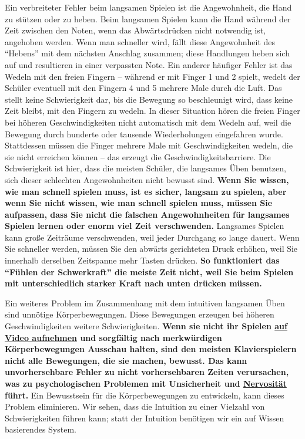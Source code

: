 Ein verbreiteter Fehler beim langsamen Spielen ist die Angewohnheit, die Hand zu stützen oder zu heben.
Beim langsamen Spielen kann die Hand während der Zeit zwischen den Noten, wenn das Abwärtsdrücken nicht notwendig ist, angehoben werden.
Wenn man schneller wird, fällt diese Angewohnheit des \enquote{Hebens} mit dem nächsten Anschlag zusammen; diese Handlungen heben sich auf und resultieren in einer verpassten Note.
Ein anderer häufiger Fehler ist das Wedeln mit den freien Fingern -- während er mit Finger 1 und 2 spielt, wedelt der Schüler eventuell mit den Fingern 4 und 5 mehrere Male durch die Luft.
Das stellt keine Schwierigkeit dar, bis die Bewegung so beschleunigt wird, dass keine Zeit bleibt, mit den Fingern zu wedeln.
In dieser Situation hören die freien Finger bei höheren Geschwindigkeiten nicht automatisch mit dem Wedeln auf, weil die Bewegung durch hunderte oder tausende Wiederholungen eingefahren wurde.
Stattdessen müssen die Finger mehrere Male mit Geschwindigkeiten wedeln, die sie nicht erreichen können -- das erzeugt die Geschwindigkeitsbarriere.
Die Schwierigkeit ist hier, dass die meisten Schüler, die langsames Üben benutzen, sich dieser schlechten Angewohnheiten nicht bewusst sind.
\textbf{Wenn Sie wissen, wie man schnell spielen muss, ist es sicher, langsam zu spielen, aber wenn Sie nicht wissen, wie man schnell spielen muss, müssen Sie aufpassen, dass Sie nicht die falschen Angewohnheiten für langsames Spielen lernen oder enorm viel Zeit verschwenden.}
Langsames Spielen kann große Zeiträume verschwenden, weil jeder Durchgang so lange dauert.
Wenn Sie schneller werden, müssen Sie den abwärts gerichteten Druck erhöhen, weil Sie innerhalb derselben Zeitspanne mehr Tasten drücken.
\textbf{So funktioniert das \enquote{Fühlen der Schwerkraft} die meiste Zeit nicht, weil Sie beim Spielen mit unterschiedlich starker Kraft nach unten drücken müssen.}

Ein weiteres Problem im Zusammenhang mit dem intuitiven langsamen Üben sind unnötige Körperbewegungen.
Diese Bewegungen erzeugen bei höheren Geschwindigkeiten weitere Schwierigkeiten.
\textbf{Wenn sie nicht ihr Spielen \hyperref[c1iii13]{auf Video aufnehmen} und sorgfältig nach merkwürdigen Körperbewegungen Ausschau halten, sind den meisten Klavierspielern nicht alle Bewegungen, die sie machen, bewusst. 
Das kann unvorhersehbare Fehler zu nicht vorhersehbaren Zeiten verursachen, was zu psychologischen Problemen mit Unsicherheit und \hyperref[c1iii15]{Nervosität} führt.}
Ein Bewusstsein für die Körperbewegungen zu entwickeln, kann dieses Problem eliminieren.
Wir sehen, dass die Intuition zu einer Vielzahl von Schwierigkeiten führen kann; statt der Intuition benötigen wir ein auf Wissen basierendes System.


